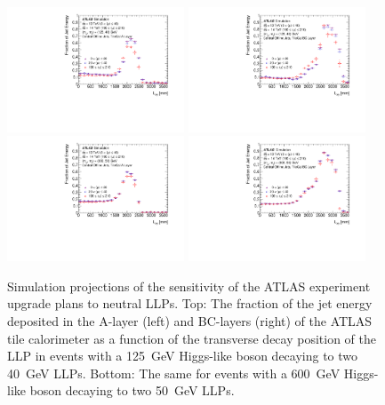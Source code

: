 \begin{figure}[hbtp]
\begin{center}
\includegraphics[width=0.47\textwidth]{figures/caloratio1.pdf}
\includegraphics[width=0.47\textwidth]{figures/caloratio2.pdf}\\
\includegraphics[width=0.47\textwidth]{figures/caloratio3.pdf}
\includegraphics[width=0.47\textwidth]{figures/caloratio4.pdf}\\
\caption{Simulation projections of the sensitivity of the ATLAS experiment upgrade plans to neutral LLPs. Top: The fraction of the jet energy deposited in the A-layer (left) and BC-layers (right) of the ATLAS tile calorimeter as a function of the transverse decay position of the LLP in events with a 125~GeV Higgs-like boson decaying to two 40~GeV LLPs. Bottom: The same for events with a 600~GeV Higgs-like boson decaying to two 50~GeV LLPs.}
\label{fig:Caloratio}
\end{center}
\end{figure}


